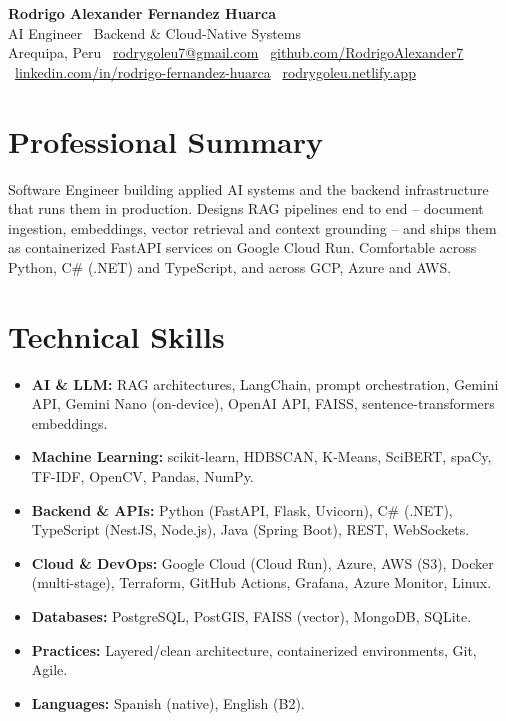\documentclass[11pt,letterpaper]{article}
\begin{document}
\begin{center}
  {\LARGE \textbf{Rodrigo Alexander Fernandez Huarca}}\\[5pt]
  {\large AI Engineer \textbar\ Backend \& Cloud-Native Systems}\\[4pt]
  Arequipa, Peru \textbar\
  \href{mailto:rodrygoleu7@gmail.com}{rodrygoleu7@gmail.com} \textbar\
  \href{https://github.com/RodrigoAlexander7}{github.com/RodrigoAlexander7} \textbar\
  \href{https://linkedin.com/in/rodrigo-fernandez-huarca}{linkedin.com/in/rodrigo-fernandez-huarca} \textbar\
  \href{https://rodrygoleu.netlify.app}{rodrygoleu.netlify.app}
\end{center}

\section{Professional Summary}
Software Engineer building applied AI systems and the backend infrastructure that runs them in production.
Designs RAG pipelines end to end -- document ingestion, embeddings, vector retrieval and context grounding --
and ships them as containerized FastAPI services on Google Cloud Run. Comfortable across Python, C\# (.NET)
and TypeScript, and across GCP, Azure and AWS.

\section{Technical Skills}
\begin{itemize}
  \item \textbf{AI \& LLM:} RAG architectures, LangChain, prompt orchestration, Gemini API, Gemini Nano (on-device), OpenAI API, FAISS, sentence-transformers embeddings.
  \item \textbf{Machine Learning:} scikit-learn, HDBSCAN, K-Means, SciBERT, spaCy, TF-IDF, OpenCV, Pandas, NumPy.
  \item \textbf{Backend \& APIs:} Python (FastAPI, Flask, Uvicorn), C\# (.NET), TypeScript (NestJS, Node.js), Java (Spring Boot), REST, WebSockets.
  \item \textbf{Cloud \& DevOps:} Google Cloud (Cloud Run), Azure, AWS (S3), Docker (multi-stage), Terraform, GitHub Actions, Grafana, Azure Monitor, Linux.
  \item \textbf{Databases:} PostgreSQL, PostGIS, FAISS (vector), MongoDB, SQLite.
  \item \textbf{Practices:} Layered/clean architecture, containerized environments, Git, Agile.
  \item \textbf{Languages:} Spanish (native), English (B2).
\end{itemize}
\end{document}
